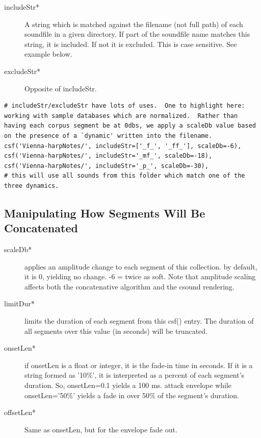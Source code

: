 \documentclass{article}
\begin{document}
\begin{spacing}{1.2}
\begin{description}
\item[includeStr*] A string which is matched against the filename (not full path) of each soundfile in a given directory.  If part of the soundfile name matches this string, it is included.  If not it is excluded.  This is case sensitive.  See example below.

\item[excludeStr*] Opposite of includeStr.
\end{description}

\begin{lstlisting}
# includeStr/excludeStr have lots of uses.  One to highlight here: working with sample databases which are normalized.  Rather than having each corpus segment be at 0dbs, we apply a scaleDb value based on the presence of a `dynamic' written into the filename.
csf('Vienna-harpNotes/', includeStr=['_f_', '_ff_'], scaleDb=-6),
csf('Vienna-harpNotes/', includeStr='_mf_', scaleDb=-18),
csf('Vienna-harpNotes/', includeStr='_p_', scaleDb=-30),
# this will use all sounds from this folder which match one of the three dynamics.
\end{lstlisting}





\subsection{Manipulating How Segments Will Be Concatenated}
\begin{description}
\item[scaleDb*] applies an amplitude change to each segment of this collection. by default, it is 0, yielding no change. -6 = twice as soft.  Note that amplitude scaling affects both the concatenative algorithm and the csound rendering.  

\item[limitDur*] limits the duration of each segment from this csf() entry.  The duration of all segments over this value (in seconds) will be truncated.  

\item[onsetLen*] if onsetLen is a float or integer, it is the fade-in time in seconds.  If it is a string formed as '10\%', it is interpreted as a percent of each segment's duration.  So, onsetLen=0.1 yields a 100 ms. attack envelope while onsetLen='50\%' yields a fade in over 50\% of the segment's duration.

\item[offsetLen*] Same as onsetLen, but for the envelope fade out.


\end{description}
\end{spacing}
\end{document}
